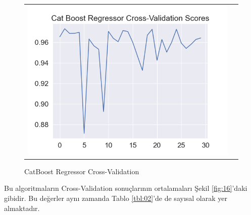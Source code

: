 \documentclass[conference]{IEEEtran}
\begin{document}
\begin{figure}[!h]
	\centering
	\begin{center}
		\begin{tabular}{cc}
			\includegraphics[scale=0.5]{pictures/pic_15.png}&
		\end{tabular}
	\end{center}
	\caption{CatBoost Regressor Cross-Validation}
	\label{fig:15}
\end{figure}

\quad Bu algoritmaların Cross-Validation sonuçlarının ortalamaları Şekil \ref{fig:16}'daki gibidir. Bu değerler aynı zamanda Tablo \ref{tbl:02}'de de sayısal olarak yer almaktadır.
\end{document}
